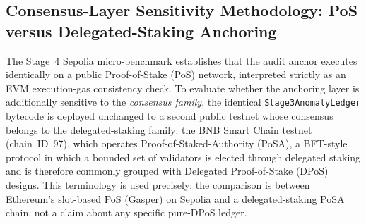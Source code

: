 
\subsection{Consensus-Layer Sensitivity Methodology: PoS versus
Delegated-Staking Anchoring}
\label{sec:consensus-method}

The Stage~4 Sepolia micro-benchmark establishes that the audit anchor
executes identically on a public Proof-of-Stake (PoS) network, interpreted
strictly as an EVM execution-gas consistency check. To evaluate whether the
anchoring layer is additionally sensitive to the \emph{consensus family}, the
identical \texttt{Stage3AnomalyLedger} bytecode is deployed unchanged to a
second public testnet whose consensus belongs to the delegated-staking
family: the BNB Smart Chain testnet (chain~ID~97), which operates
Proof-of-Staked-Authority (PoSA), a BFT-style protocol in which a bounded
set of validators is elected through delegated staking and is therefore
commonly grouped with Delegated Proof-of-Stake (DPoS) designs. This
terminology is used precisely: the comparison is between Ethereum's
slot-based PoS (Gasper) on Sepolia and a delegated-staking PoSA chain, not
a claim about any specific pure-DPoS ledger.

